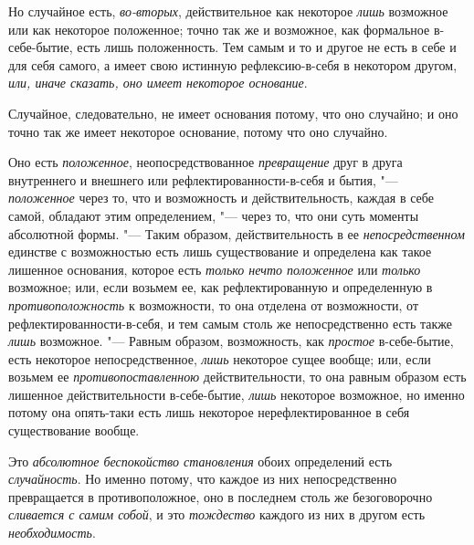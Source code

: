 Но случайное есть, {\em во-вторых}, действительное как
некоторое {\em лишь} возможное или как некоторое
положенное; точно так же и возможное, как формальное в-себе-бытие, есть
лишь положенность. Тем самым и то и другое не есть в себе и для себя
самого, а имеет свою истинную рефлексию-в-себя в некотором другом,
{\em или, иначе сказать, оно имеет некоторое
основание}.

Случайное, следовательно, не имеет основания потому, что оно случайно; и оно
точно так же имеет некоторое основание, потому что оно случайно.

Оно есть {\em положенное}, неопосредствованное
{\em превращение} друг в друга внутреннего и внешнего
или рефлектированности-в-себя и бытия, "---
{\em положенное} через то, что и возможность и
действительность, каждая в себе самой, обладают этим определением, "--- через
то, что они суть моменты абсолютной формы. "--- Таким образом,
действительность в ее {\em непосредственном} единстве с
возможностью есть лишь существование и определена как такое лишенное
основания, которое есть {\em только нечто положенное}
или {\em только} возможное; или, если возьмем ее, как
рефлектированную и определенную в
{\em противоположность} к возможности, то она отделена
от возможности, от рефлектированности-в-себя, и тем самым столь же
непосредственно есть также {\em лишь} возможное. "---
Равным образом, возможность, как {\em простое}
в-себе-бытие, есть некоторое непосредственное,
{\em лишь} некоторое сущее вообще; или, если возьмем ее
{\em противопоставленною} действительности, то она
равным образом есть лишенное действительности в-себе-бытие,
{\em лишь} некоторое возможное, но именно потому она
опять-таки есть лишь некоторое нерефлектированное в себя существование
вообще.

Это {\em абсолютное беспокойство становления} обоих
определений есть {\em случайность}. Но именно потому,
что каждое из них непосредственно превращается в противоположное, оно в
последнем столь же безоговорочно {\em сливается с самим
собой}, и это {\em тождество} каждого из них в другом
есть {\em необходимость}.

